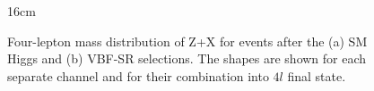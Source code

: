 \begin{figure}[htbp]{16cm}
	\caption{Four-lepton mass distribution of Z+X for events after the (a) SM Higgs and (b) VBF-SR selections. The shapes are shown for each separate channel and for their combination into $4l$ final state.}
	\centering
	\label{fig:m4l_zx_os_shapes}
\end{figure}


